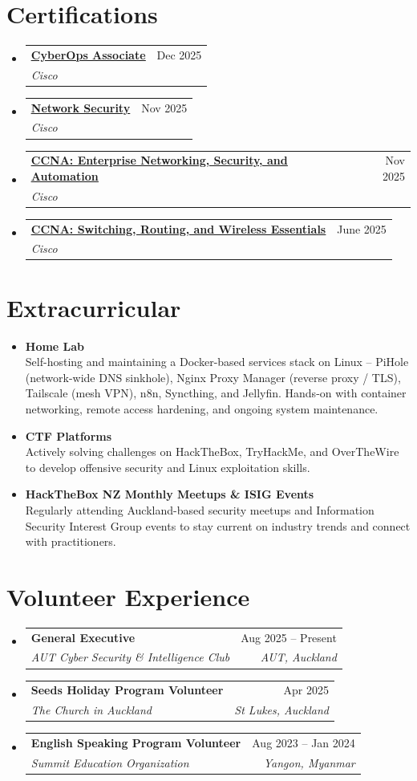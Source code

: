 \documentclass[letterpaper,11pt]{article}
\makeatletter
\newcommand{\resumeItem}[1]{\item\small{{#1}}}
\newcommand{\resumeSubheading}[4]{
  \item
    \begin{tabular*}{0.97\textwidth}[t]{l@{\extracolsep{\fill}}r}
      \textbf{#1} & #2 \\
      \textit{\small#3} & \textit{\small #4} \\
    \end{tabular*}
}
\newcommand{\resumeSubHeadingListStart}{\begin{itemize}[leftmargin=0.15in, label={}]}
\newcommand{\resumeSubHeadingListEnd}{\end{itemize}}
\makeatother
\begin{document}
\section{Certifications}
\resumeSubHeadingListStart
\resumeSubheading
{\href{https://www.credly.com/badges/8795b497-6f62-45b6-ab3e-139453dae7c3/public_url}{\underline{CyberOps Associate}}}{Dec 2025}
{Cisco}{}
\resumeSubheading
{\href{https://www.credly.com/badges/91cf8969-2010-4ddf-a14a-4fce25c8fea8/linked_in_profile}{\underline{Network Security}}}{Nov 2025}
{Cisco}{}
\resumeSubheading
{\href{https://www.credly.com/badges/ba060768-da23-4aec-907d-2b298e098bf4/linked_in_profile}{\underline{CCNA: Enterprise Networking, Security, and Automation}}}{Nov 2025}
{Cisco}{}
\resumeSubheading
{\href{https://www.credly.com/badges/47a7c265-1168-4e4a-b90c-6b38c1c89fa4/public_url}{\underline{CCNA: Switching, Routing, and Wireless Essentials}}}{June 2025}
{Cisco}{}
\resumeSubHeadingListEnd

\section{Extracurricular}
\resumeSubHeadingListStart
\resumeItem{\textbf{Home Lab} \\
Self-hosting and maintaining a Docker-based services stack on Linux -- PiHole (network-wide DNS sinkhole), Nginx Proxy Manager (reverse proxy / TLS), Tailscale (mesh VPN), n8n, Syncthing, and Jellyfin. Hands-on with container networking, remote access hardening, and ongoing system maintenance.}
\resumeItem{\textbf{CTF Platforms} \\
Actively solving challenges on HackTheBox, TryHackMe, and OverTheWire to develop offensive security and Linux exploitation skills.}
\resumeItem{\textbf{HackTheBox NZ Monthly Meetups \& ISIG Events} \\
Regularly attending Auckland-based security meetups and Information Security Interest Group events to stay current on industry trends and connect with practitioners.}
\resumeSubHeadingListEnd

\section{Volunteer Experience}
\resumeSubHeadingListStart
  \resumeSubheading
    {General Executive}{Aug 2025 -- Present}
    {AUT Cyber Security \& Intelligence Club}{AUT, Auckland}
  \resumeSubheading
    {Seeds Holiday Program Volunteer}{Apr 2025}
    {The Church in Auckland}{St Lukes, Auckland}
  \resumeSubheading
    {English Speaking Program Volunteer}{Aug 2023 -- Jan 2024}
    {Summit Education Organization}{Yangon, Myanmar}
\resumeSubHeadingListEnd
\end{document}
